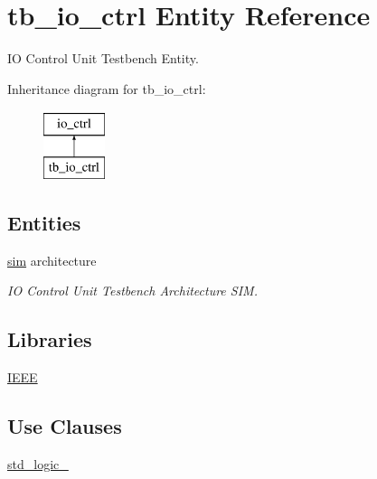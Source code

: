 \hypertarget{classtb__io__ctrl}{}\section{tb\+\_\+io\+\_\+ctrl Entity Reference}
\label{classtb__io__ctrl}


IO Control Unit Testbench Entity.  


Inheritance diagram for tb\+\_\+io\+\_\+ctrl\+:\begin{figure}[H]
\begin{center}
\leavevmode
\includegraphics[height=2.000000cm]{classtb__io__ctrl}
\end{center}
\end{figure}
\subsection*{Entities}
\begin{DoxyCompactItemize}
\item 
\hyperlink{classtb__io__ctrl_1_1sim}{sim} architecture
\begin{DoxyCompactList}\small\item\em IO Control Unit Testbench Architecture S\+IM. \end{DoxyCompactList}\end{DoxyCompactItemize}
\subsection*{Libraries}
 \begin{DoxyCompactItemize}
\item 
\hyperlink{classtb__io__ctrl_ae4f03c286607f3181e16b9aa12d0c6d4}{I\+E\+EE} 
\end{DoxyCompactItemize}
\subsection*{Use Clauses}
 \begin{DoxyCompactItemize}
\item 
\hyperlink{classtb__io__ctrl_acd03516902501cd1c7296a98e22c6fcb}{std\+\_\+logic\+\_}   
\end{DoxyCompactItemize}


